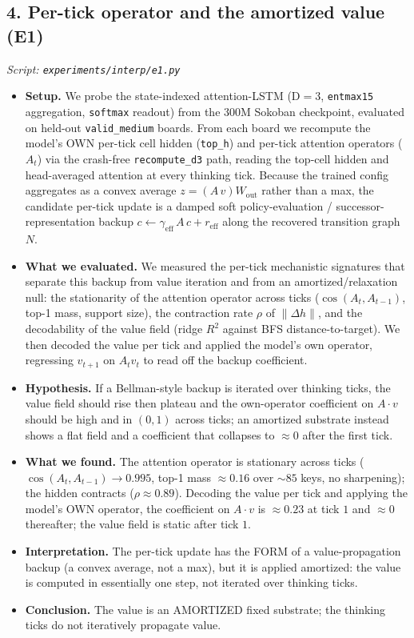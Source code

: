 \documentclass[11pt]{article}
\begin{document}
\subsection*{4. Per-tick operator and the amortized value (E1)}
\textit{Script: \texttt{experiments/interp/e1.py}}
\begin{itemize}
\item \textbf{Setup.} We probe the state-indexed attention-LSTM (D$=3$, \texttt{entmax15} aggregation, \texttt{softmax} readout) from the 300M Sokoban checkpoint, evaluated on held-out \texttt{valid\_medium} boards. From each board we recompute the model's OWN per-tick cell hidden (\texttt{top\_h}) and per-tick attention operators ($A_t$) via the crash-free \texttt{recompute\_d3} path, reading the top-cell hidden and head-averaged attention at every thinking tick. Because the trained config aggregates as a convex average $z=(A\,v)W_{\mathrm{out}}$ rather than a max, the candidate per-tick update is a damped soft policy-evaluation / successor-representation backup $c \leftarrow \gamma_{\mathrm{eff}}\,A\,c + r_{\mathrm{eff}}$ along the recovered transition graph $N$.
\item \textbf{What we evaluated.} We measured the per-tick mechanistic signatures that separate this backup from value iteration and from an amortized/relaxation null: the stationarity of the attention operator across ticks ($\cos(A_t,A_{t-1})$, top-1 mass, support size), the contraction rate $\rho$ of $\lVert \Delta h \rVert$, and the decodability of the value field (ridge $R^2$ against BFS distance-to-target). We then decoded the value per tick and applied the model's own operator, regressing $v_{t+1}$ on $A_t v_t$ to read off the backup coefficient.
\item \textbf{Hypothesis.} If a Bellman-style backup is iterated over thinking ticks, the value field should rise then plateau and the own-operator coefficient on $A\cdot v$ should be high and in $(0,1)$ across ticks; an amortized substrate instead shows a flat field and a coefficient that collapses to $\approx 0$ after the first tick.
\item \textbf{What we found.} The attention operator is stationary across ticks ($\cos(A_t,A_{t-1})\to 0.995$, top-1 mass $\approx 0.16$ over $\sim 85$ keys, no sharpening); the hidden contracts ($\rho\approx 0.89$). Decoding the value per tick and applying the model's OWN operator, the coefficient on $A\cdot v$ is $\approx 0.23$ at tick $1$ and $\approx 0$ thereafter; the value field is static after tick $1$.
\item \textbf{Interpretation.} The per-tick update has the FORM of a value-propagation backup (a convex average, not a max), but it is applied amortized: the value is computed in essentially one step, not iterated over thinking ticks.
\item \textbf{Conclusion.} The value is an AMORTIZED fixed substrate; the thinking ticks do not iteratively propagate value.
\end{itemize}
\clearpage
\end{document}
